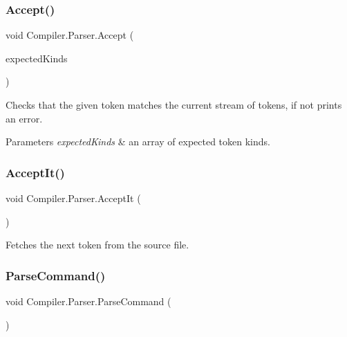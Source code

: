 \subsubsection{\texorpdfstring{Accept()}{Accept()}}
{\footnotesize\ttfamily void Compiler.\+Parser.\+Accept (\begin{DoxyParamCaption}\item[{params \mbox{\hyperlink{namespace_compiler_a57929962f25004759596fc3f13cf563c}{Token\+Kind}} \mbox{[}$\,$\mbox{]}}]{expected\+Kinds }\end{DoxyParamCaption})\hspace{0.3cm}{\ttfamily [protected]}}

Checks that the given token matches the current stream of tokens, if not prints an error. 
\begin{DoxyParams}{Parameters}
{\em expected\+Kinds} & an array of expected token kinds. \\
\hline
\end{DoxyParams}
\mbox{\label{class_compiler_1_1_parser_ae19e507e1e2460cbad35b03d24402b4f}} 
\subsubsection{\texorpdfstring{Accept\+It()}{AcceptIt()}}
{\footnotesize\ttfamily void Compiler.\+Parser.\+Accept\+It (\begin{DoxyParamCaption}{ }\end{DoxyParamCaption})\hspace{0.3cm}{\ttfamily [protected]}}

Fetches the next token from the source file. \mbox{\label{class_compiler_1_1_parser_a7ab30d3d783ccf064784df2df654ea76}} 
\subsubsection{\texorpdfstring{Parse\+Command()}{ParseCommand()}}
{\footnotesize\ttfamily void Compiler.\+Parser.\+Parse\+Command (\begin{DoxyParamCaption}{ }\end{DoxyParamCaption})\hspace{0.3cm}{\ttfamily [protected]}}

